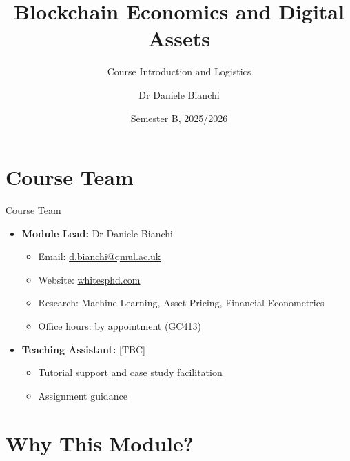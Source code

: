 \documentclass[10pt]{beamer}
\title{Blockchain Economics and Digital Assets}
\subtitle{Course Introduction and Logistics}
\author{Dr Daniele Bianchi}
\institute{Queen Mary, University of London}
\date{Semester B, 2025/2026}
\begin{document}
\begin{frame}[plain]
  \titlepage
\end{frame}

\section{Course Team}

\begin{frame}{Course Team}
  \begin{itemize}
    \item \textbf{Module Lead:} Dr Daniele Bianchi
    \begin{itemize}
      \item Email: \url{d.bianchi@qmul.ac.uk}
      \item Website: \url{whitesphd.com}
      \item Research: Machine Learning, Asset Pricing, Financial Econometrics
      \item Office hours: by appointment (GC413)
    \end{itemize}
    
    \vspace{1em}
    \item \textbf{Teaching Assistant:} [TBC]
    \begin{itemize}
      \item Tutorial support and case study facilitation
      \item Assignment guidance
    \end{itemize}
  \end{itemize}
  
\end{frame}

\section{Why This Module?}
\end{document}
